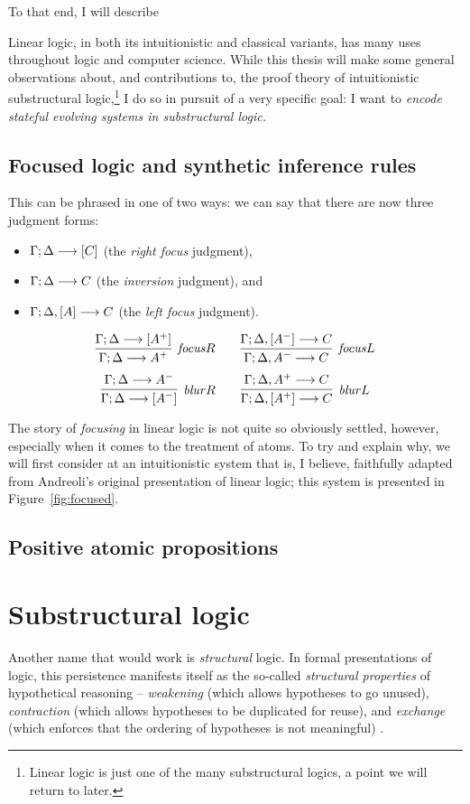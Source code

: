  To that end, I will describe 

Linear logic, in both its intuitionistic and classical variants, has
many uses throughout logic and computer science. While this thesis
will make some general observations about, and contributions to, the
proof theory of intuitionistic substructural logic,\footnote{Linear logic is
just one of the many substructural logics, a point we will return to
later.} I do so in pursuit of a very specific goal: I want to {\it encode
stateful evolving systems in substructural logic.}

\section{Focused logic and synthetic inference rules}


 This can be phrased
in one of two ways: we can say that there are now three judgment
forms:
\begin{itemize}
\item ${\Gamma};{\Delta} \longrightarrow [{C}] \mathstrut$ (the {\it right focus} judgment),
\item ${\Gamma};{\Delta} \longrightarrow {C} \mathstrut$ (the {\it inversion} judgment), and
\item ${\Gamma};{\Delta}, [{A}] \longrightarrow {C} \mathstrut$ (the {\it left focus} judgment).
\end{itemize}

\[
\infer[{\it focus}R]
{\seq{\Gamma}{\Delta}{A^+}}
{\seq{\Gamma}{\Delta}{[A^+]}}
\qquad
\infer[{\it focus}L]
{\seq{\Gamma}{\Delta,A^-}{C}}
{\seq{\Gamma}{\Delta,[A^-]}{C}}
\]\[
\infer[{\it blur}R]
{\seq{\Gamma}{\Delta}{[A^-]}}
{\seq{\Gamma}{\Delta}{A^-}}
\qquad
\infer[{\it blur}L]
{\seq{\Gamma}{\Delta, [A^+]}{C}}
{\seq{\Gamma}{\Delta, A^+}{C}}
\]


The story of {\it focusing} in linear logic is not quite so 
obviously settled, however, especially when it comes to the treatment
of atoms. To try and explain why, we will first consider at 
an intuitionistic system that is, I believe, faithfully adapted from 
Andreoli's original presentation of linear logic; this system is
presented in Figure~\ref{fig:focused}.

\section{Positive atomic propositions}

\chapter{Substructural logic}

Another name that would work
is {\it structural} logic. In formal presentations of logic, this
persistence manifests itself as the so-called {\it structural
  properties} of hypothetical reasoning -- {\it weakening} (which
allows hypotheses to go unused), {\it contraction} (which allows
hypotheses to be duplicated for reuse), and {\it exchange} (which
enforces that the ordering of hypotheses is not meaningful)
\cite{gentzen35untersuchungen}.
